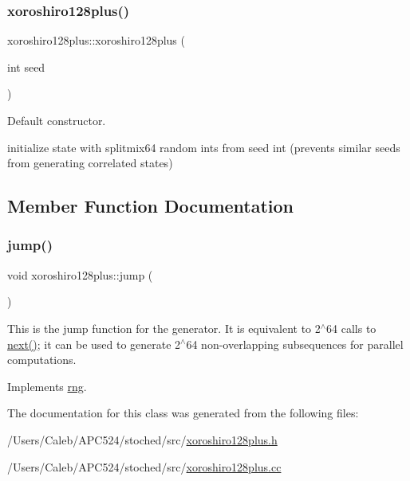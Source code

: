 \subsubsection{\texorpdfstring{xoroshiro128plus()}{xoroshiro128plus()}}
{\footnotesize\ttfamily xoroshiro128plus\+::xoroshiro128plus (\begin{DoxyParamCaption}\item[{int}]{seed }\end{DoxyParamCaption})}



Default constructor. 

initialize state with splitmix64 random ints from seed int (prevents similar seeds from generating correlated states) 

\subsection{Member Function Documentation}
\mbox{\label{classxoroshiro128plus_a8058dee37dfc67409ed8674ba8f830a9}} 
\subsubsection{\texorpdfstring{jump()}{jump()}}
{\footnotesize\ttfamily void xoroshiro128plus\+::jump (\begin{DoxyParamCaption}{ }\end{DoxyParamCaption})\hspace{0.3cm}{\ttfamily [virtual]}}

This is the jump function for the generator. It is equivalent to 2$^\wedge$64 calls to \hyperlink{classxoroshiro128plus_a14185bcb657d561663803f4a8b2e9a92}{next()}; it can be used to generate 2$^\wedge$64 non-\/overlapping subsequences for parallel computations. 

Implements \hyperlink{classrng_a2203fb1d2504c000306be5a0035d1a6c}{rng}.



The documentation for this class was generated from the following files\+:\begin{DoxyCompactItemize}
\item 
/\+Users/\+Caleb/\+A\+P\+C524/stoched/src/\hyperlink{xoroshiro128plus_8h}{xoroshiro128plus.\+h}\item 
/\+Users/\+Caleb/\+A\+P\+C524/stoched/src/\hyperlink{xoroshiro128plus_8cc}{xoroshiro128plus.\+cc}\end{DoxyCompactItemize}
